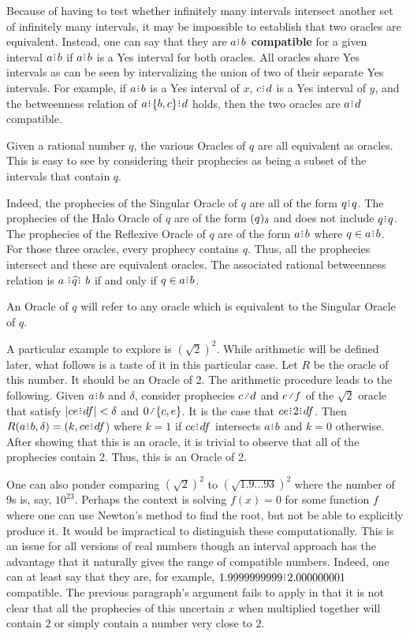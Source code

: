 \documentclass[12pt]{article}
\begin{document}
Because of having to test whether infinitely many intervals intersect another set of infinitely many intervals, it may be impossible to establish that two oracles are equivalent. Instead, one can say that they are \textbf{$a\rint b$ compatible} for a given interval $a\rint b$ if $a\rint b$ is a Yes interval for both oracles. All oracles share Yes intervals as can be seen by intervalizing the union of two of their separate Yes intervals. For example, if $a\rint b$ is a Yes interval of $x$, $c\rint d$ is a Yes interval of $y$, and the betweenness relation of $a\rint \{b,c\}\rint d$ holds, then the two oracles are $a\rint d$ compatible.  


 Given a rational number $q$, the various Oracles of $q$ are all equivalent as oracles. This is easy to see by considering their prophecies as being a subset of the intervals that contain $q$.
 
 Indeed, the prophecies of the Singular Oracle of $q$ are all of the form $q\rint q$. The prophecies of the Halo Oracle of $q$ are of the form $(q)_{\delta}$ and does not include $q \rint q$. The prophecies of the Reflexive Oracle of $q$ are of the form $a\rint b$ where $q \in a\rint b$.  For those three oracles, every prophecy contains $q$. Thus, all the prophecies intersect and these are equivalent oracles. The associated rational betweenness relation is $a \xora[q] b$ if and only if $q \in a\rint b$. 
 
 An Oracle of $q$ will refer to any oracle which is equivalent to the Singular Oracle of $q$. 

A particular example to explore is $(\sqrt{2})^2$. While arithmetic will be defined later, what follows is a taste of it in this particular case. Let $R$ be the oracle of this number. It should be an Oracle of 2. The arithmetic procedure leads to the following. Given $a\rint b$ and $\delta$, consider prophecies $c\lte d$ and $e\lte f$ of the $\sqrt{2}$ oracle that satisfy $|ce\rint df| < \delta$ and $0\lte \{c,e\}$. It is the case that $ce\rint 2\rint df$. Then $R(a\rint b, \delta) = (k, ce\rint df$) where $k = 1$ if $ce\rint df$ intersects $a\rint b$ and $k=0$ otherwise. After showing that this is an oracle, it is trivial to observe that all of the prophecies contain 2. Thus, this is an Oracle of 2. 

One can also ponder comparing $(\sqrt{2})^2$ to $(\sqrt{1.9\ldots93})^2$ where the number of 9s is, say, $10^{23}$. Perhaps  the context is solving $f(x) = 0$ for some function $f$ where one can use Newton's method to find the root, but not be able to explicitly produce it. It would be impractical to distinguish these computationally. This is an issue for all versions of real numbers though an interval approach has the advantage that it naturally gives the range of compatible numbers. Indeed, one can at least say that they are, for example, $1.9999999999\rint 2.000000001$ compatible. The previous paragraph's argument fails to apply in that it is not clear that all the prophecies of this uncertain $x$ when multiplied together will contain $2$ or simply contain a number very close to $2$. 
\end{document}
